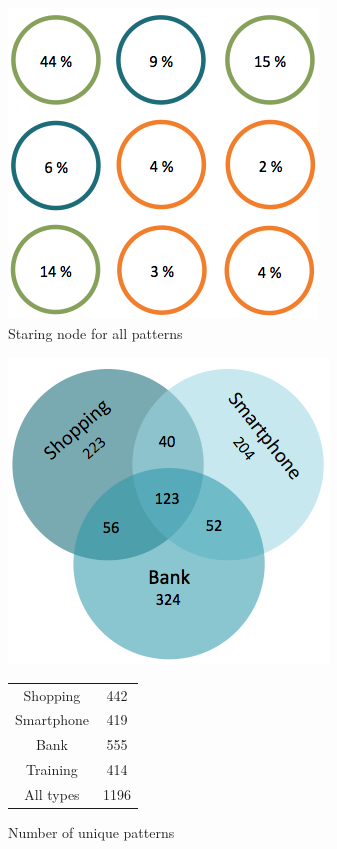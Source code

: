     \begin{figure}[H]
      \centering
      \includegraphics[scale=0.45]{pics/analysis/startingNode.png}
      \caption{Staring node for all patterns}
      \label{fig:startingNode}
    \end{figure}

    \begin{figure}[H]
      \centering
      \begin{minipage}[b]{0.40\linewidth}
      \centering
        \includegraphics[scale=0.4]{pics/analysis/uniquePatternsVenn.png}
      \end{minipage}%
      \begin{minipage}[b]{0.30\linewidth}
        \centering
        \begin{tabular}{ c | c }
          \hline
          Shopping &  442 \\
          Smartphone & 419 \\
          Bank & 555 \\
          Training & 414 \\ \hline \hline
          All types & 1196 \\ \hline
        \end{tabular}
        \vspace{1cm}
      \end{minipage}
      \caption{Number of unique patterns}
      \label{fig:test}
    \end{figure}

